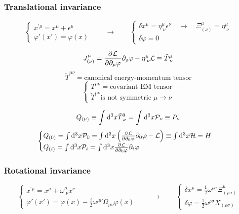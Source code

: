 \subsubsection{Translational invariance}
\[ \begin{cases}
x^{\prime\mu} = x^\mu + \epsilon^\mu \\ \varphi'(x') = \varphi(x)
\end{cases} \qquad \to \qquad \begin{cases}
\delta x^\mu = \eta^{\mu}_{\;\nu}\epsilon^\nu \quad \to \quad \Xi^\mu_{(\nu)} = \eta^{\mu}_{\;\nu} \\ \delta \varphi = 0
\end{cases} \]


\[ J^\mu_{(\nu)} =  \frac{\partial{^{}}\mathcal{L}}{\partial{{\partial_\mu\varphi}^{}}} \partial_\rho\varphi - \eta^\mu_{\;\nu}\mathcal{L} \equiv \tilde{T}^\mu_{\;\nu} \]
\[ \tilde{T}^{\mu\nu} = \text{canonical energy-momentum tensor} \]
\[\begin{cases}
T^{\mu\nu} = \text{covariant EM tensor} \\
\tilde{T}^{\mu\nu} \text{is not symmetric $\mu\to\nu$}
\end{cases} \]

\[ Q_{(\nu)} \equiv \int \operatorname{d \!}{^3x}\tilde{T}^{0}_{\;\nu} = \int \operatorname{d \!}{^3x}\mathcal{P}_\nu \equiv P_\nu \]
 \[\begin{cases}
Q_{(0)} = \int \operatorname{d \!}{^3x}\mathcal{P}_0 = \int \operatorname{d \!}{^3x}\left( \frac{\partial{^{}}\mathcal{L}}{\partial{{\partial_0\varphi}^{}}} \partial_0\varphi - \mathcal{L}\right) \equiv \int \operatorname{d \!}{^3x}\mathcal{H} = H \\
Q_{(i)} = \int \operatorname{d \!}{^3x}\mathcal{P}_i = \int \operatorname{d \!}{^3x} \frac{\partial{^{}}\mathcal{L}}{\partial{{\partial_0\varphi}^{}}} \partial_i\varphi
\end{cases}
\]

\subsubsection{Rotational invariance}
\[ \begin{cases}
x^{\prime\mu} = x^\mu + \omega^\mu_{\;\nu} x^\nu \\ \varphi'(x') = \varphi(x) - \frac{i}{2}\omega^{\mu\nu}\Omega_{\mu\nu}\varphi(x)
\end{cases} \qquad \to \qquad \begin{cases}
\delta x^\mu = \frac{1}{2}\omega^{\rho\sigma}\Xi^\mu_{(\rho\sigma)} \\ \delta \varphi = \frac{1}{2}\omega^{\rho\sigma}X_{(\rho\sigma)}
\end{cases} \]

